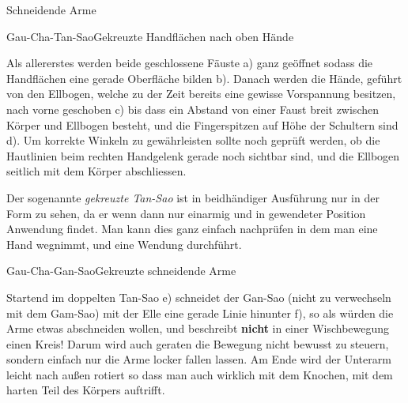 \begin{WTSatz}{Schneidende Arme}%


	\begin{WTSatzTeil}{Gau-Cha-Tan-Sao}{Gekreuzte Handfl\"achen nach oben H\"ande}
		
		Als allererstes werden beide geschlossene F\"auste a) ganz ge\"offnet sodass die Handfl\"achen eine gerade Oberfl\"ache bilden b). Danach werden die H\"ande, gef\"uhrt von den Ellbogen, welche zu der Zeit bereits eine gewisse Vorspannung besitzen, nach vorne geschoben c) bis dass ein Abstand von einer Faust breit zwischen K\"orper und Ellbogen besteht, und die Fingerspitzen auf H\"ohe der Schultern sind d). Um korrekte Winkeln zu gew\"ahrleisten sollte noch gepr\"uft werden, ob die Hautlinien beim rechten Handgelenk gerade noch sichtbar sind, und die Ellbogen seitlich mit dem K\"orper abschliessen.

		
		Der sogenannte \textit{gekreuzte Tan-Sao} ist in beidh\"andiger Ausf\"uhrung nur in der Form zu sehen, da er wenn dann nur einarmig und in gewendeter Position Anwendung findet. Man kann dies ganz einfach nachpr\"ufen in dem man eine Hand wegnimmt, und eine Wendung durchf\"uhrt.
		
	\end{WTSatzTeil}
	
	\begin{WTSatzTeil}{Gau-Cha-Gan-Sao}{Gekreuzte schneidende Arme}
		
		Startend im doppelten Tan-Sao e) schneidet der Gan-Sao (nicht zu verwechseln mit dem Gam-Sao) mit der Elle eine gerade Linie hinunter f), so als w\"urden die Arme etwas abschneiden wollen, und beschreibt \textbf{nicht} in einer Wischbewegung einen Kreis! Darum wird auch geraten die Bewegung nicht bewusst zu steuern, sondern einfach nur die Arme locker fallen lassen. Am Ende wird der Unterarm leicht nach au{\ss}en rotiert so dass man auch wirklich mit dem Knochen, mit dem harten Teil des K\"orpers auftrifft.
	\end{WTSatzTeil}
	

\end{WTSatz}

